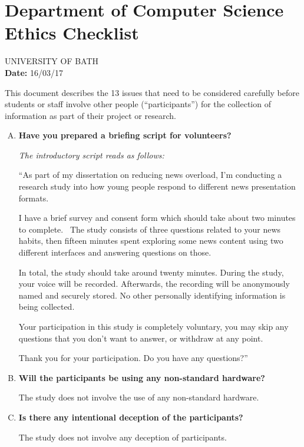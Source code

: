 \section{Department of Computer Science Ethics Checklist}
\renewcommand{\labelenumi}{\arabic{enumi})}

\begin{center} UNIVERSITY OF BATH \\[0.3cm] \textbf{Date:} 16/03/17 \end{center}

This document describes the 13 issues that need to be considered carefully before students or staff involve other people (``participants'') for the collection of information as part of their project or research.

\begin{enumerate}[Q.1]
	\item\textbf{Have you prepared a briefing script for volunteers?} \par
	\textit{The introductory script reads as follows:} \par ``As part of my dissertation on reducing news overload, I'm conducting a research study into how young people respond to different news presentation formats. \par I have a brief survey and consent form which should take about two minutes to complete.  The study consists of three questions related to your news habits, then fifteen minutes spent exploring some news content using two different interfaces and answering questions on those. \par In total, the study should take around twenty minutes. During the study, your voice will be recorded. Afterwards, the recording will be anonymously named and securely stored. No other personally identifying information is being collected. \par Your participation in this study is completely voluntary, you may skip any questions that you don't want to answer, or withdraw at any point. \par Thank you for your participation. Do you have any questions?''
	\item\textbf{Will the participants be using any non-standard hardware?} \par
	The study does not involve the use of any non-standard hardware.
	\item\textbf{Is there any intentional deception of the participants?} \par
	The study does not involve any deception of participants.

\end{enumerate}
